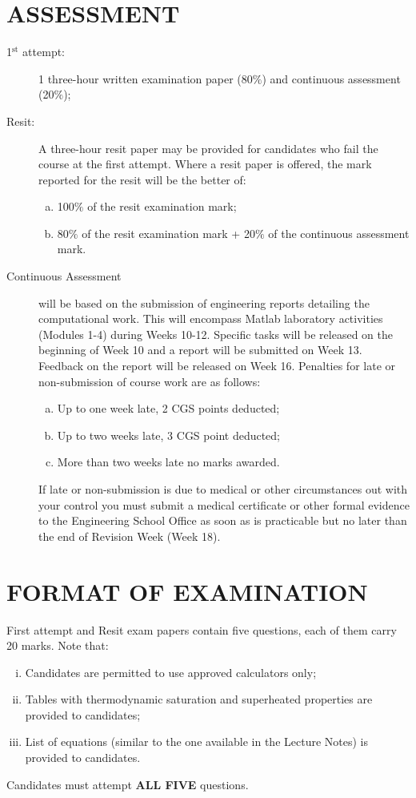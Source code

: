 \documentclass[12pts,a4paper,amsmath,amssymb,floatfix]{article}%
\begin{document}
\section{ASSESSMENT}
   \begin{description}
      \item[1$^{\text{st}}$ attempt:] 1 three-hour written examination paper (80$\%$) and continuous assessment (20$\%$);
%     
      \item[Resit:] A three-hour resit paper may be provided for candidates who fail the course at the first attempt. Where a resit paper is offered, the mark reported for the resit will be the better of:
         \begin{enumerate}[(a)]
            \item 100$\%$ of the resit examination mark;
            \item 80$\%$ of the resit examination mark + 20$\%$ of the continuous assessment mark.
         \end{enumerate}
%
       \item[Continuous Assessment] will be based on the submission of engineering reports detailing the computational work. This will encompass Matlab laboratory activities (Modules 1-4) during Weeks 10-12. Specific tasks will be released on the beginning of Week 10 and a report will be submitted on Week 13. Feedback on the report will be released on Week 16. Penalties for late or non-submission of course work are as follows:
         \begin{enumerate}[(a)]
            \item Up to one week late, 2 CGS points deducted;
            \item Up to two weeks late, 3 CGS point deducted;
            \item More than two weeks late no marks awarded.
         \end{enumerate}
         If late or non-submission is due to medical or other circumstances out with your control you must submit a medical certificate or other formal evidence to the Engineering School Office as soon as is practicable but no later than the end of Revision Week (Week 18).
%         
   \end{description}


\section{FORMAT OF EXAMINATION}
First attempt and Resit exam papers contain five questions, each of them carry 20 marks. Note that:
    \begin{enumerate}[(i)]
       \item Candidates are permitted to use approved calculators only;
       \item Tables with thermodynamic saturation and superheated properties are provided to candidates;
       \item List of equations (similar to the one available in the Lecture Notes) is provided to candidates.
    \end{enumerate}
Candidates must attempt {\bf ALL FIVE} questions.
\medskip
\end{document}
